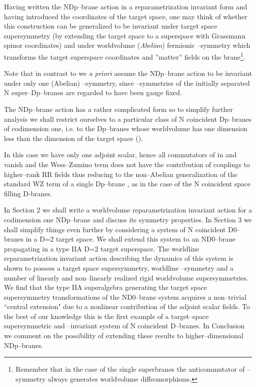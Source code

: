 \documentclass[a4paper,12pt]{article}
\begin{document}
Having written the NDp--brane action in a reparametrization
invariant form and having introduced the coordinates \coordHE{} of the
target space, one may think of whether this construction can be
generalized to be invariant under target space supersymmetry (by
extending the target space to a superspace with Grassmann spinor
coordinates) and under worldvolume ({\it Abelian}) fermionic
\myHighlight{$\kappa$}\coordHE{}--symmetry which transforms the target superspace
coordinates and ''matter'' fields on the brane\footnote{Remember that in the case of
the single superbranes the anticommutator of \myHighlight{$\kappa$}\coordHE{}--symmetry
always generates worldvolume diffeomorphisms.}.

Note that in contrast to \cite{Bergshoeff:2001kt} we {\it a
priori} assume the NDp--brane action to be invariant under only
one (Abelian) \myHighlight{$\kappa$}\coordHE{}--symmetry, since \coordHE{}  \myHighlight{$\kappa$}\coordHE{}--symmetries
of the initially separated N super--Dp--branes are regarded to
have been gauge fixed.

The NDp--brane action  has a rather complicated form so to
simplify further analysis we shall restrict ourselves to a
particular class of N coincident Dp--branes of codimension one,
i.e. to the Dp--branes whose worldvolume has one dimension less
than the dimension of the target space (\coordHE{}).

In this case we have only one \coordHE{} adjoint scalar, hence all
commutators of \myHighlight{$\Phi(\sigma)$}\coordHE{} in  and  vanish and the
Wess--Zumino term does not have the contribution of couplings to
higher--rank RR fields thus reducing to the non--Abelian
generalization of the standard WZ term of a single Dp--brane
\cite{dbrane}, as in the case of the N coincident space filling D-branes.

In Section 2 we shall write a worldvolume reparametrization
invariant action for a codimension one NDp--brane and discuss its
symmetry properties. In Section 3 we shall simplify things even
further by considering a system of N coincident D0--branes in a
D=2 target space. We shall extend this system to an ND0--brane
propagating in a type IIA D=2 target superspace. The worldline
reparametrization invariant action describing the dynamics of this
system is shown to possess a target space supersymmetry, worldline
\myHighlight{$\kappa$}\coordHE{}--symmetry and a number of linearly and non--linearly realized
rigid worldvolume supersymmetries. We find that the type IIA \coordHE{}
superalgebra generating the target space supersymmetry
transformations of the ND0--brane system acquires a non--trivial
``central extension" due to a nonlinear  contribution of the
\coordHE{} adjoint scalar fields. To the best of our knowledge this is
the first example of a target--space supersymmetric and
\myHighlight{$\kappa$}\coordHE{}--invariant system of N coincident D--branes. In
Conclusion we comment on the possibility of extending these
results to higher--dimensional NDp--branes.
\end{document}
